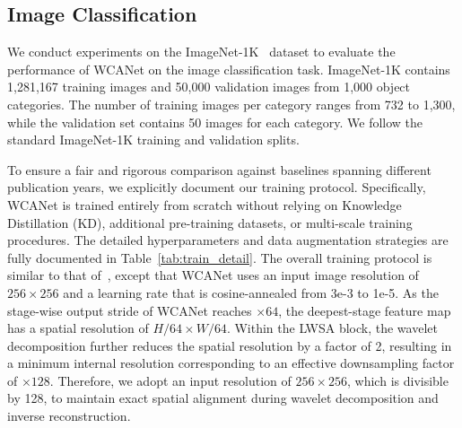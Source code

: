 \documentclass[a4paper,fleqn]{cas-dc}
\begin{document}
\subsection{Image Classification}


We conduct experiments on the ImageNet-1K~\cite{deng2009imagenet} dataset to evaluate the performance of WCANet on the image classification task. 
{\color{blue}
ImageNet-1K contains 1,281,167 training images and 50,000 validation images
from 1,000 object categories. The number of training images per category
ranges from 732 to 1,300, while the validation set contains 50 images for
each category. We follow the standard ImageNet-1K training and validation
splits.
}

{To ensure a fair and rigorous comparison against baselines spanning different publication years, we explicitly document our training protocol. Specifically, WCANet is trained entirely from scratch without relying on Knowledge Distillation (KD), additional pre-training datasets, or multi-scale training procedures. The detailed hyperparameters and data augmentation strategies are fully documented in Table~\ref{tab:train_detail}.} The overall training protocol is similar to that of~\cite{liu2023efficientvit,wang2025lsnet,he2025mobilemamba}, except that WCANet uses an input image resolution of $256 \times 256$ and a learning rate that is cosine-annealed from 3e-3 to 1e-5. 
{\color{blue}
As the stage-wise output stride of WCANet reaches $\times64$, the deepest-stage
feature map has a spatial resolution of $H/64 \times W/64$. Within the LWSA
block, the wavelet decomposition further reduces the spatial resolution by a
factor of 2, resulting in a minimum internal resolution corresponding to an
effective downsampling factor of $\times128$. Therefore, we adopt an input
resolution of $256\times256$, which is divisible by 128, to maintain exact
spatial alignment during wavelet decomposition and inverse reconstruction.
}
\end{document}
